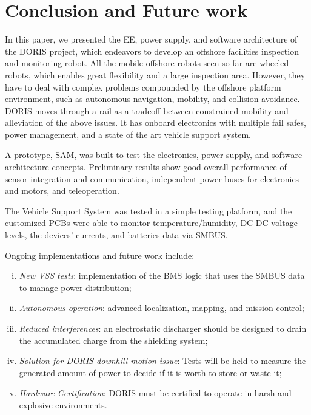 \documentclass{ifacconf}
\begin{document}
\section{Conclusion and Future work}\label{sec:conclusions}
In this paper, we presented the EE, power supply, and software architecture of
the DORIS project, which endeavors to develop an offshore facilities inspection
and monitoring robot. All the mobile offshore robots seen so far are wheeled
robots, which enables great flexibility and a large inspection area. However,
they have to deal with complex problems compounded by the offshore platform
environment, such as autonomous navigation, mobility, and collision avoidance.
DORIS moves through a rail as a tradeoff between constrained
mobility and alleviation of the above issues. It has onboard electronics with
multiple fail safes, power management, and a state of the art vehicle support
system.

A prototype, SAM, was built to test the electronics, power supply, and software
architecture concepts. Preliminary results show good overall performance of
sensor integration and communication, independent power buses for electronics
and motors, and teleoperation.

The Vehicle Support System was tested in a simple testing platform, and the
customized PCBs were able to monitor temperature/humidity, DC-DC voltage levels,
the devices' currents, and batteries data via SMBUS. 

Ongoing implementations and future work include:
\begin{enumerate}[i)]
 
  \item \emph{New VSS tests}:
  implementation of the BMS logic that uses the SMBUS data to manage power
  distribution;
  \item \emph{Autonomous operation}: advanced localization, mapping, and
  mission control; 
  \item \emph{Reduced interferences}:
  an electrostatic discharger should be designed to drain the accumulated
  charge from the shielding system;
  \item \emph{Solution for DORIS downhill motion issue}: Tests will be held to
  measure the generated amount of power to decide if it is worth to store or
  waste it;
  \item \emph{Hardware Certification}: 
  DORIS must be certified to operate in harsh and explosive environments.
\end{enumerate}



\appendix
\end{document}
